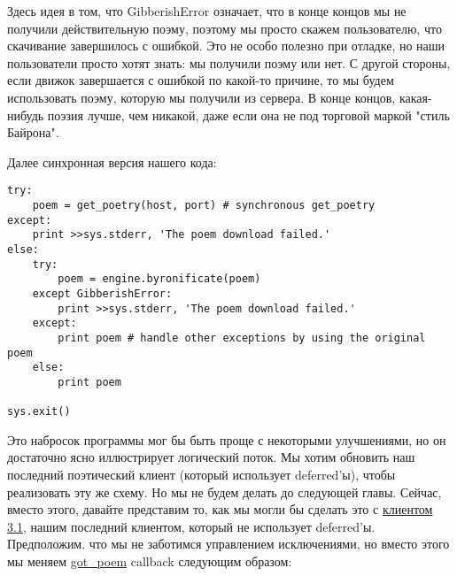 Здесь идея в том, что GibberishError означает, что в конце концов 
мы не получили действительную поэму, поэтому мы просто скажем 
пользователю, что скачивание завершилось с ошибкой. Это не особо 
полезно при отладке, но наши пользователи просто хотят 
знать: мы получили поэму или нет. С другой стороны, если движок 
завершается с ошибкой по какой-то причине, то мы будем использовать 
поэму, которую мы получили из сервера. В конце концов, какая-нибудь 
поэзия лучше, чем никакой, даже если она не под торговой маркой "стиль Байрона". 


Далее синхронная версия нашего кода:


 \begin{verbatim}
try:
    poem = get_poetry(host, port) # synchronous get_poetry
except:
    print >>sys.stderr, 'The poem download failed.'
else:
    try:
        poem = engine.byronificate(poem)
    except GibberishError:
        print >>sys.stderr, 'The poem download failed.'
    except:
        print poem # handle other exceptions by using the original poem
    else:
        print poem

sys.exit()
\end{verbatim} 



Это набросок программы мог бы быть проще с некоторыми улучшениями, но он 
достаточно ясно иллюстрирует логический поток. Мы хотим обновить наш 
последний поэтический клиент (который использует deferred'ы), чтобы 
реализовать эту же схему. Но мы не будем делать до следующей главы. 
Сейчас, вместо этого, давайте представим то, как мы могли бы сделать 
это с  
\href{http://github.com/jdavisp3/twisted-intro/blob/master/twisted-client-3/get-poetry-1.py}{клиентом 3.1},  
нашим последний клиентом, который не использует deferred'ы. Предположим. что мы 
не заботимся управлением исключениями, но вместо этого мы меняем 
\href{http://github.com/jdavisp3/twisted-intro/blob/master/twisted-client-3/get-poetry-1.py#L106}{got\_poem} 
callback следующим образом:


